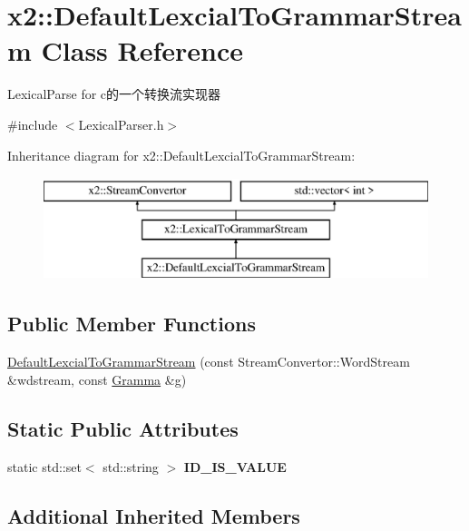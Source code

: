 \hypertarget{classx2_1_1_default_lexcial_to_grammar_stream}{}\section{x2\+:\+:Default\+Lexcial\+To\+Grammar\+Stream Class Reference}
\label{classx2_1_1_default_lexcial_to_grammar_stream}


Lexical\+Parse for c的一个转换流实现器  




{\ttfamily \#include $<$Lexical\+Parser.\+h$>$}

Inheritance diagram for x2\+:\+:Default\+Lexcial\+To\+Grammar\+Stream\+:\begin{figure}[H]
\begin{center}
\leavevmode
\includegraphics[height=3.000000cm]{classx2_1_1_default_lexcial_to_grammar_stream}
\end{center}
\end{figure}
\subsection*{Public Member Functions}
\begin{DoxyCompactItemize}
\item 
\hyperlink{classx2_1_1_default_lexcial_to_grammar_stream_ab9e8a0468eb091fd118b55ab78adc273}{Default\+Lexcial\+To\+Grammar\+Stream} (const Stream\+Convertor\+::\+Word\+Stream \&wdstream, const \hyperlink{classx2_1_1_gramma}{Gramma} \&g)
\end{DoxyCompactItemize}
\subsection*{Static Public Attributes}
\begin{DoxyCompactItemize}
\item 
static std\+::set$<$ std\+::string $>$ {\bfseries I\+D\+\_\+\+I\+S\+\_\+\+V\+A\+L\+UE}
\end{DoxyCompactItemize}
\subsection*{Additional Inherited Members}


